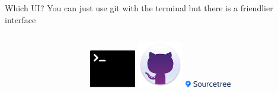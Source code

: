 \documentclass[10pt]{beamer}
\begin{document}
{\begin{frame}[fragile]{Which UI?}
You can just use git with the terminal but there is a friendlier interface\\
\begin{columns}[T]
\begin{column}{.8\textwidth}
\end{column}
\begin{column}{.2\textwidth}
\includegraphics[width=2cm]{Figs/git/terminal} \newline \newline \newline 
\includegraphics[width=2cm]{Figs/git/gitdesktop} \newline \newline \newline 
\includegraphics[width=2cm]{Figs/git/Sourcetree}
\end{column}
\end{columns}
\end{frame}


}
\end{document}
